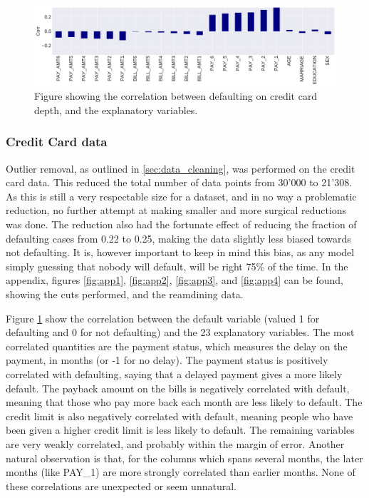 \documentclass[10pt, twocolumn]{article}
\begin{document}
\begin{figure}[ht!]
    \centering
    \includegraphics[scale=0.4]{../figs/CC_corr_bars.pdf}
    \caption{Figure showing the correlation between defaulting on credit card depth, and the explanatory variables.}
    \label{fig:CC_corr_bars}
\end{figure}

\subsubsection{Credit Card data}
Outlier removal, as outlined in \cref{sec:data_cleaning}, was performed on the credit card data. This reduced the total number of data points from 30'000 to 21'308. As this is still a very respectable size for a dataset, and in no way a problematic reduction, no further attempt at making smaller and more surgical reductions was done. The reduction also had the fortunate effect of reducing the fraction of defaulting cases from 0.22 to 0.25, making the data slightly less biased towards not defaulting. It is, however important to keep in mind this bias, as any model simply guessing that nobody will default, will be right 75\% of the time. In the appendix, figures \ref{fig:app1}, \ref{fig:app2}, \ref{fig:app3}, and \ref{fig:app4} can be found, showing the cuts performed, and the reamdining data.

Figure \ref{fig:CC_corr_bars} show the correlation between the default variable (valued 1 for defaulting and 0 for not defaulting) and the 23 explanatory variables. The most correlated quantities are the payment status, which measures the delay on the payment, in months (or -1 for no delay). The payment status is positively correlated with defaulting, saying that a delayed payment gives a more likely default. The payback amount on the bills is negatively correlated with default, meaning that those who pay more back each month are less likely to default. The credit limit is also negatively correlated with default, meaning people who have been given a higher credit limit is less likely to default. The remaining variables are very weakly correlated, and probably within the margin of error. Another natural observation is that, for the columns which spans several months, the later months (like PAY\_1) are more strongly correlated than earlier months. None of these correlations are unexpected or seem unnatural.
\end{document}
